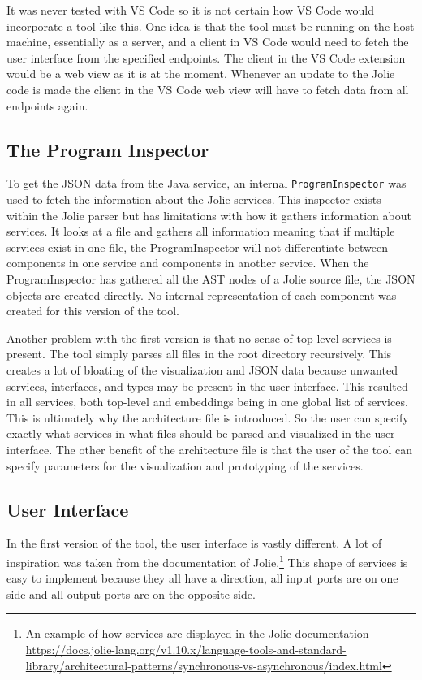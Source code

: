 It was never tested with VS Code so it is not certain how VS Code would incorporate a tool like this. One idea is
that the tool must be running on the host machine, essentially as a server, and a client in VS Code would need to fetch the user interface from the specified endpoints.
The client in the VS Code extension would be a web view as it is at the moment.
Whenever an update to the Jolie code is made the client in the VS Code web view will have to fetch data from all endpoints again.

\subsection{The Program Inspector}
To get the JSON data from the Java service, an internal \texttt{ProgramInspector} was used to fetch the information about the Jolie services. This inspector exists within the Jolie parser but has limitations with how it gathers information about services.
It looks at a file and gathers all information meaning that if multiple services exist in one file, the ProgramInspector will not differentiate between components in one service and components in another service.
When the ProgramInspector has gathered all the AST nodes of a Jolie source file, the JSON objects are created directly. No internal representation of each component was created for this version of the tool.

Another problem with the first version is that no sense of top-level services is present. The tool simply parses all files in the root directory recursively. This creates a lot of bloating of the visualization and JSON data because unwanted services, interfaces, and types may be present in the user interface.
This resulted in all services, both top-level and embeddings being in one global list of services.
This is ultimately why the architecture file is introduced. So the user can specify exactly what services in what files should be parsed and visualized in the user interface. The other benefit of the architecture file is that the user of the tool can specify parameters for the visualization and prototyping of the services.

\subsection{User Interface}
In the first version of the tool, the user interface is vastly different. A lot of inspiration was taken from the documentation of Jolie.\footnote{An example of how services are displayed in the Jolie documentation - \url{https://docs.jolie-lang.org/v1.10.x/language-tools-and-standard-library/architectural-patterns/synchronous-vs-asynchronous/index.html}}
This shape of services is easy to implement because they all have a direction, all input ports are on one side and all output ports are on the opposite side.

